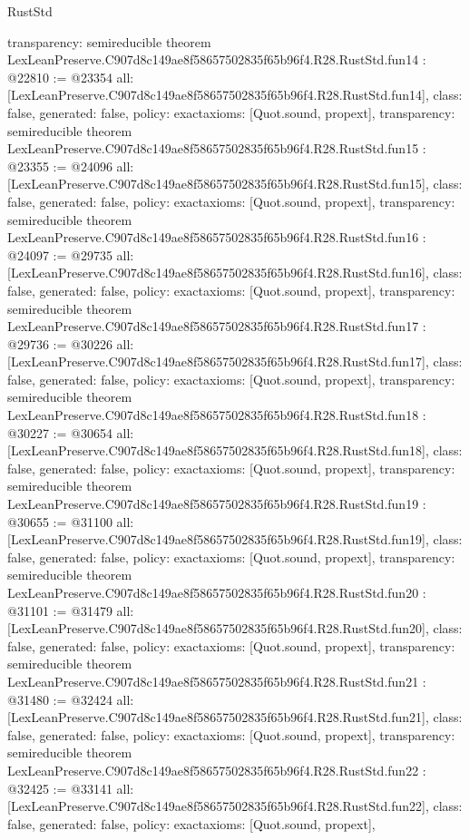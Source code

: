 \begin{lexlean}{RustStd}
\begin{coremodule}
{  transparency: semireducible
}
theorem LexLeanPreserve.C907d8c149ae8f58657502835f65b96f4.R28.RustStd.fun14 : @22810 := @23354 {
  all: [LexLeanPreserve.C907d8c149ae8f58657502835f65b96f4.R28.RustStd.fun14],
  class: false,
  generated: false,
  policy: exact{axioms: [Quot.sound, propext]},
  transparency: semireducible
}
theorem LexLeanPreserve.C907d8c149ae8f58657502835f65b96f4.R28.RustStd.fun15 : @23355 := @24096 {
  all: [LexLeanPreserve.C907d8c149ae8f58657502835f65b96f4.R28.RustStd.fun15],
  class: false,
  generated: false,
  policy: exact{axioms: [Quot.sound, propext]},
  transparency: semireducible
}
theorem LexLeanPreserve.C907d8c149ae8f58657502835f65b96f4.R28.RustStd.fun16 : @24097 := @29735 {
  all: [LexLeanPreserve.C907d8c149ae8f58657502835f65b96f4.R28.RustStd.fun16],
  class: false,
  generated: false,
  policy: exact{axioms: [Quot.sound, propext]},
  transparency: semireducible
}
theorem LexLeanPreserve.C907d8c149ae8f58657502835f65b96f4.R28.RustStd.fun17 : @29736 := @30226 {
  all: [LexLeanPreserve.C907d8c149ae8f58657502835f65b96f4.R28.RustStd.fun17],
  class: false,
  generated: false,
  policy: exact{axioms: [Quot.sound, propext]},
  transparency: semireducible
}
theorem LexLeanPreserve.C907d8c149ae8f58657502835f65b96f4.R28.RustStd.fun18 : @30227 := @30654 {
  all: [LexLeanPreserve.C907d8c149ae8f58657502835f65b96f4.R28.RustStd.fun18],
  class: false,
  generated: false,
  policy: exact{axioms: [Quot.sound, propext]},
  transparency: semireducible
}
theorem LexLeanPreserve.C907d8c149ae8f58657502835f65b96f4.R28.RustStd.fun19 : @30655 := @31100 {
  all: [LexLeanPreserve.C907d8c149ae8f58657502835f65b96f4.R28.RustStd.fun19],
  class: false,
  generated: false,
  policy: exact{axioms: [Quot.sound, propext]},
  transparency: semireducible
}
theorem LexLeanPreserve.C907d8c149ae8f58657502835f65b96f4.R28.RustStd.fun20 : @31101 := @31479 {
  all: [LexLeanPreserve.C907d8c149ae8f58657502835f65b96f4.R28.RustStd.fun20],
  class: false,
  generated: false,
  policy: exact{axioms: [Quot.sound, propext]},
  transparency: semireducible
}
theorem LexLeanPreserve.C907d8c149ae8f58657502835f65b96f4.R28.RustStd.fun21 : @31480 := @32424 {
  all: [LexLeanPreserve.C907d8c149ae8f58657502835f65b96f4.R28.RustStd.fun21],
  class: false,
  generated: false,
  policy: exact{axioms: [Quot.sound, propext]},
  transparency: semireducible
}
theorem LexLeanPreserve.C907d8c149ae8f58657502835f65b96f4.R28.RustStd.fun22 : @32425 := @33141 {
  all: [LexLeanPreserve.C907d8c149ae8f58657502835f65b96f4.R28.RustStd.fun22],
  class: false,
  generated: false,
  policy: exact{axioms: [Quot.sound, propext]},
}
\end{coremodule}
\end{lexlean}
